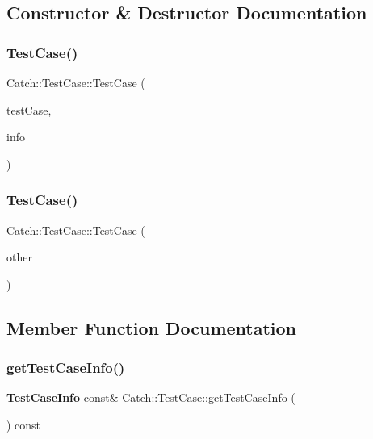 \subsection{Constructor \& Destructor Documentation}
\mbox{\label{class_catch_1_1_test_case_a03a5b913484681bd6d398dc5e9c2a907}} 
\subsubsection{Test\+Case()\hspace{0.1cm}{\footnotesize\ttfamily [1/2]}}
{\footnotesize\ttfamily Catch\+::\+Test\+Case\+::\+Test\+Case (\begin{DoxyParamCaption}\item[{\textbf{ I\+Test\+Case} $\ast$}]{test\+Case,  }\item[{\textbf{ Test\+Case\+Info} const \&}]{info }\end{DoxyParamCaption})}

\mbox{\label{class_catch_1_1_test_case_ac0011d3789edc3e44edb41f13c4775a0}} 
\subsubsection{Test\+Case()\hspace{0.1cm}{\footnotesize\ttfamily [2/2]}}
{\footnotesize\ttfamily Catch\+::\+Test\+Case\+::\+Test\+Case (\begin{DoxyParamCaption}\item[{\textbf{ Test\+Case} const \&}]{other }\end{DoxyParamCaption})}



\subsection{Member Function Documentation}
\mbox{\label{class_catch_1_1_test_case_a1ea0d79f49156cebea076fe1ba50d2b6}} 
\subsubsection{get\+Test\+Case\+Info()}
{\footnotesize\ttfamily \textbf{ Test\+Case\+Info} const\& Catch\+::\+Test\+Case\+::get\+Test\+Case\+Info (\begin{DoxyParamCaption}{ }\end{DoxyParamCaption}) const}

